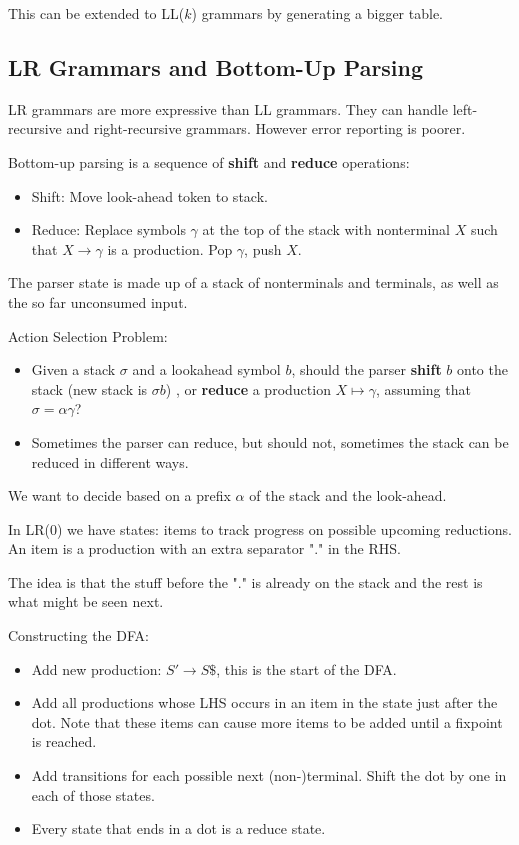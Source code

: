 This can be extended to LL($k$) grammars by generating a bigger table.


\subsection*{LR Grammars and Bottom-Up Parsing}

LR grammars are more expressive than LL grammars. They can handle left-recursive and right-recursive grammars. However error reporting is poorer. \medskip

Bottom-up parsing is a sequence of \textbf{shift} and \textbf{reduce} operations:
\begin{itemize}
	\item Shift: Move look-ahead token to stack.
	
	\item Reduce: Replace symbols $\gamma$ at the top of the stack with nonterminal $X$ such that $X \to \gamma$ is a production. Pop $\gamma$, push $X$.
\end{itemize}

The parser state is made up of a stack of nonterminals and terminals, as well as the so far unconsumed input.\medskip
			
Action Selection Problem:
\begin{itemize}
	\item Given a stack $\sigma$ and a lookahead symbol $b$, should the parser \textbf{shift} $b$ onto the stack (new stack is $\sigma b$) , or \textbf{reduce} a production $X \mapsto \gamma$, assuming that $\sigma = \alpha \gamma$?
	
	\item Sometimes the parser can reduce, but should not, sometimes the stack can be reduced in different ways.
\end{itemize}

We want to decide based on a prefix $\alpha$ of the stack and the look-ahead. \medskip
		
In LR(0) we have states: items to track progress on possible upcoming reductions. An item is a production with an extra separator "." in the RHS. \medskip
		
The idea is that the stuff before the "." is already on the stack and the rest is what might be seen next. \medskip
		
Constructing the DFA:
\begin{itemize}
	\item Add new production: $S' \to S\$$, this is the start of the DFA.
						
	\item Add all productions whose LHS occurs in an item in the state just after the dot. Note that these items can cause more items to be added until a fixpoint is reached.
			
	\item Add transitions for each possible next (non-)terminal. Shift the dot by one in each of those states.
	
	\item Every state that ends in a dot is a reduce state.
\end{itemize} 

